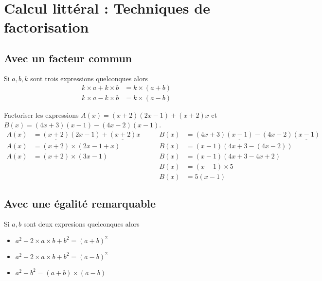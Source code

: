 \section{Calcul littéral : Techniques de factorisation}
\subsection{Avec un facteur commun}
\begin{propriete}[\admise]
    Si $a,b,k$  sont trois expressions quelconques alors 
    \begin{align*}
        k\times a+k\times b&=k\times(a+b)\\
        k\times a-k\times b&=k\times(a-b)
    \end{align*}
\end{propriete}

\begin{exemples*1}
    Factoriser les expressions $A(x)=(x+2)(2x-1)+(x+2)x$ et $B(x)=(4x+3)(x-1)-(4x-2)(x-1)$. 
    \begin{align*}
        A(x)&=\underline{(x+2)}(2x-1)+\underline{(x+2)}x\qquad&B(x)&=(4x+3)\underline{(x-1)}-(4x-2)\underline{(x-1)}\\
        A(x)&=(x+2)\times(2x-1+x)                             &B(x)&=(x-1)(4x+3-(4x-2))\\
        A(x)&=(x+2)\times(3x-1)                               &B(x)&=(x-1)(4x+3-4x+2)\\
         &                                                    &B(x)&=(x-1)\times5\\
         &                                                    &B(x)&=5(x-1)         
    \end{align*}
\end{exemples*1}

\subsection{Avec une égalité remarquable}
\begin{propriete}[\admise]
    Si $a,b$ sont deux expresions quelconques alors    
    \begin{itemize}        
        \item $a^2+2\times a\times b+b^2 =(a+b)^2$
        
        \smallskip
        \item $a^2-2\times a\times b+b^2 =(a-b)^2$
        
        \smallskip
        \item $a^2-b^2                   =(a+b)\times(a-b)$
    \end{itemize}
\end{propriete}

